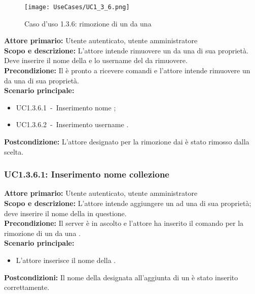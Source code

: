 \documentclass{scalatekids-article}
\begin{document}
\begin{figure}[H]
  \begin{center}
    \texttt{[image: UseCases/UC1\_3\_6.png]}
    \caption{Caso d'uso 1.3.6: rimozione di un  da una }
  \end{center}
\end{figure}
\textbf{Attore primario:} Utente autenticato, utente amministratore\\
\textbf{Scopo e descrizione:} L'attore intende rimuovere un  da una  di sua proprietà. Deve inserire il nome della  e lo username del  da rimuovere.\\
\textbf{Precondizione:} Il  è pronto a ricevere comandi e l'attore intende rimuovere un  da una  di sua proprietà.\\
\textbf{Scenario principale:}
\begin{itemize}
\item UC1.3.6.1\ -\ Inserimento nome ;
\item UC1.3.6.2\ -\ Inserimento username .
\end{itemize}
\textbf{Postcondizione:} L'attore designato per la rimozione dai  è stato rimosso dalla  scelta.

\subsubsection{UC1.3.6.1: Inserimento nome collezione}

\textbf{Attore primario:} Utente autenticato, utente amministratore\\
\textbf{Scopo e descrizione:} L'attore intende aggiungere un  ad una  di sua proprietà; deve inserire il nome della  in questione.\\
\textbf{Precondizione:} Il server è in ascolto e l'attore ha inserito il comando per la rimozione di un  da una .\\
\textbf{Scenario principale:}
\begin{itemize}
\item L'attore inserisce il nome della .
\end{itemize}
\textbf{Postcondizioni:} Il nome della  designata all'aggiunta di un  è stato inserito correttamente.
\end{document}
